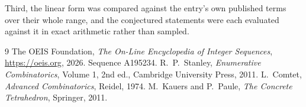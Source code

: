 \documentclass[11pt,a4paper]{article}
\theoremstyle{plain}
\theoremstyle{definition}
\begin{document}
Third, the linear form was compared against the entry's own published terms over their whole
range, and the conjectured statements were each evaluated against it in exact arithmetic
rather than sampled.

\begin{thebibliography}{9}
 The OEIS Foundation, \emph{The On-Line Encyclopedia of Integer
Sequences}, \url{https://oeis.org}, 2026. Sequence A195234.
 R.~P.~Stanley, \emph{Enumerative Combinatorics}, Volume 1, 2nd ed.,
Cambridge University Press, 2011.
 L.~Comtet, \emph{Advanced Combinatorics}, Reidel, 1974.
 M.~Kauers and P.~Paule, \emph{The Concrete Tetrahedron}, Springer, 2011.
\end{thebibliography}
\end{document}
